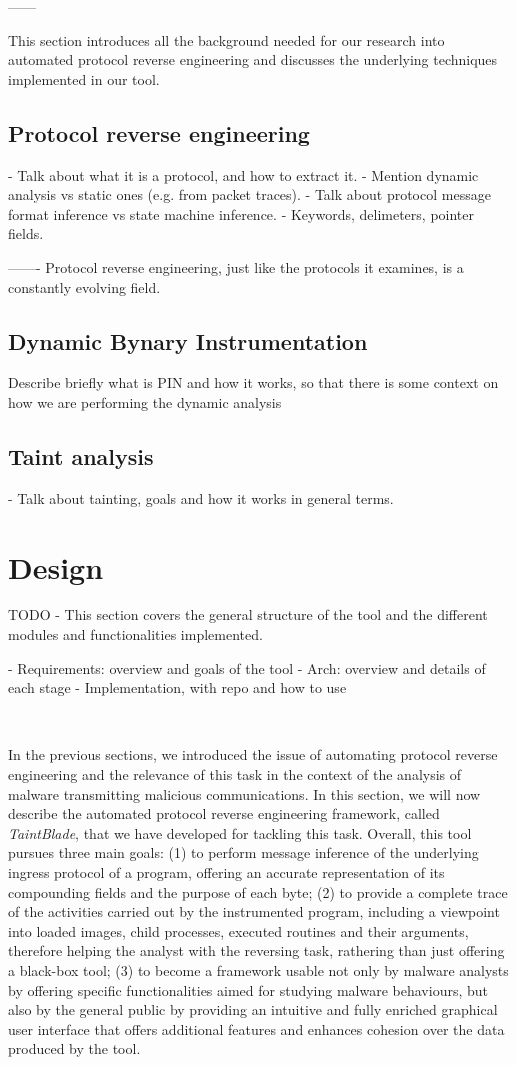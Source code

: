 \documentclass[conference]{IEEEtran}
\begin{document}
------

This section introduces all the background needed for our research into
automated protocol reverse engineering and discusses the underlying techniques
implemented in our tool.

\subsection{Protocol reverse engineering}
- Talk about what it is a protocol, and how to extract it.
- Mention dynamic analysis vs static ones (e.g. from packet traces).
- Talk about protocol message format inference vs state machine inference.
- Keywords, delimeters, pointer fields.

-------
Protocol reverse engineering, just like the protocols it examines,
is a constantly evolving field.

\subsection {Dynamic Bynary Instrumentation}
Describe briefly what is PIN and how it works, so that there is some context on
how we are performing the dynamic analysis

\subsection {Taint analysis}
- Talk about tainting, goals and how it works in general terms.

\section{Design}
TODO - This section covers the general structure of the tool and the different
modules and functionalities implemented.

- Requirements: overview and goals of the tool
- Arch: overview and details of each stage
- Implementation, with repo and how to use

\

In the previous sections, we introduced the issue of automating protocol
reverse engineering and the relevance of this task in the context of the
analysis of malware transmitting malicious communications. In this section, we
will now describe the automated protocol reverse engineering framework, called
\textit{TaintBlade}, that we have developed for tackling this task. Overall,
this tool pursues three main goals: (1) to perform message inference of the
underlying ingress protocol of a program, offering an accurate representation
of its compounding fields and the purpose of each byte; (2) to provide a
complete trace of the activities carried out by the instrumented program,
including a viewpoint into loaded images, child processes, executed routines
and their arguments, therefore helping the analyst with the reversing task,
rathering than just offering a black-box tool; (3) to become a framework usable
not only by malware analysts by offering specific functionalities aimed for
studying malware behaviours, but also by the general public by providing an
intuitive and fully enriched graphical user interface that offers additional
features and enhances cohesion over the data produced by the tool.
\end{document}
